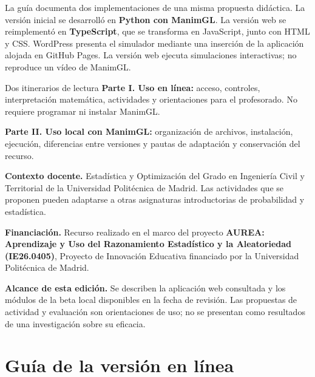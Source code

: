 \documentclass[11pt,a4paper]{article}
\begin{document}
La guía documenta dos implementaciones de una misma propuesta didáctica. La versión inicial se desarrolló en \textbf{Python con ManimGL}. La versión web se reimplementó en \textbf{TypeScript}, que se transforma en JavaScript, junto con HTML y CSS. WordPress presenta el simulador mediante una inserción de la aplicación alojada en GitHub Pages. La versión web ejecuta simulaciones interactivas; no reproduce un vídeo de ManimGL.

\begin{nota}{Dos itinerarios de lectura}
\textbf{Parte I. Uso en línea:} acceso, controles, interpretación matemática, actividades y orientaciones para el profesorado. No requiere programar ni instalar ManimGL.

\textbf{Parte II. Uso local con ManimGL:} organización de archivos, instalación, ejecución, diferencias entre versiones y pautas de adaptación y conservación del recurso.
\end{nota}

\textbf{Contexto docente.} Estadística y Optimización del Grado en Ingeniería Civil y Territorial de la Universidad Politécnica de Madrid. Las actividades que se proponen pueden adaptarse a otras asignaturas introductorias de probabilidad y estadística.

\textbf{Financiación.} Recurso realizado en el marco del proyecto \textbf{AUREA: Aprendizaje y Uso del Razonamiento Estadístico y la Aleatoriedad (IE26.0405)}, Proyecto de Innovación Educativa financiado por la Universidad Politécnica de Madrid.

\textbf{Alcance de esta edición.} Se describen la aplicación web consultada y los módulos de la beta local disponibles en la fecha de revisión. Las propuestas de actividad y evaluación son orientaciones de uso; no se presentan como resultados de una investigación sobre su eficacia.

\clearpage
{\small\setlength{\parskip}{0pt}\tableofcontents}

\clearpage\part{Guía de la versión en línea}
\end{document}
